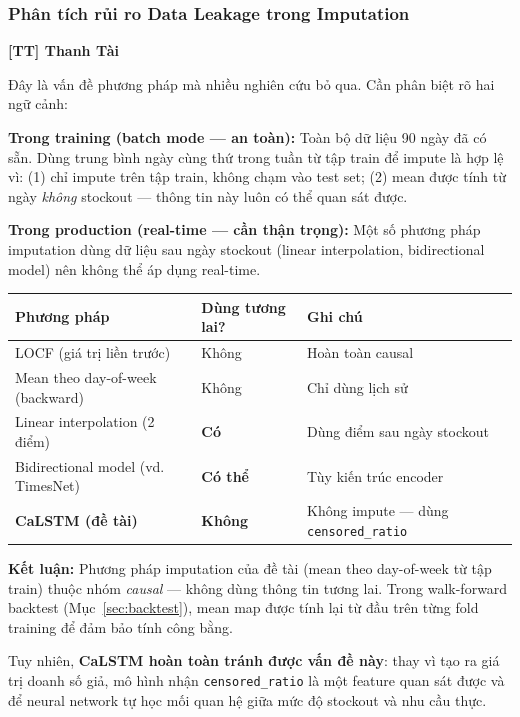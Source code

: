 \documentclass[12pt,a4paper]{report}
\newcommand{\ownerTT}{\colorbox{red!15}{\textbf{[TT] Thanh Tài}}}
\begin{document}
\subsubsection*{Phân tích rủi ro Data Leakage trong Imputation}
\ownerTT

\begin{tcolorbox}[colback=yellow!8, colframe=orange!60!black, title=\textbf{Câu hỏi quan trọng: Imputation có bị ``nhìn trước tương lai'' không?}]
Đây là vấn đề phương pháp mà nhiều nghiên cứu bỏ qua. Cần phân biệt rõ hai ngữ cảnh:

\medskip
\textbf{Trong training (batch mode --- an toàn):}
Toàn bộ dữ liệu 90 ngày đã có sẵn. Dùng trung bình ngày cùng thứ trong tuần từ tập train để impute là hợp lệ vì:
(1) chỉ impute trên tập train, không chạm vào test set;
(2) mean được tính từ ngày \emph{không} stockout --- thông tin này luôn có thể quan sát được.

\medskip
\textbf{Trong production (real-time --- cần thận trọng):}
Một số phương pháp imputation dùng dữ liệu sau ngày stockout (linear interpolation, bidirectional model) nên không thể áp dụng real-time.

\medskip
\begin{tabular}{lll}
\toprule
\textbf{Phương pháp} & \textbf{Dùng tương lai?} & \textbf{Ghi chú} \\
\midrule
LOCF (giá trị liền trước)            & Không & Hoàn toàn causal \\
Mean theo day-of-week (backward)    & Không & Chỉ dùng lịch sử \\
Linear interpolation (2 điểm)       & \textbf{Có} & Dùng điểm sau ngày stockout \\
Bidirectional model (vd. TimesNet)  & \textbf{Có thể} & Tùy kiến trúc encoder \\
\textbf{CaLSTM (đề tài)}            & \textbf{Không} & Không impute --- dùng \texttt{censored\_ratio} \\
\bottomrule
\end{tabular}

\medskip
\textbf{Kết luận:} Phương pháp imputation của đề tài (mean theo day-of-week từ tập train) thuộc nhóm \emph{causal} --- không dùng thông tin tương lai. Trong walk-forward backtest (Mục~\ref{sec:backtest}), mean map được tính lại từ đầu trên từng fold training để đảm bảo tính công bằng.

Tuy nhiên, \textbf{CaLSTM hoàn toàn tránh được vấn đề này}: thay vì tạo ra giá trị doanh số giả, mô hình nhận \texttt{censored\_ratio} là một feature quan sát được và để neural network tự học mối quan hệ giữa mức độ stockout và nhu cầu thực.
\end{tcolorbox}
\end{document}

